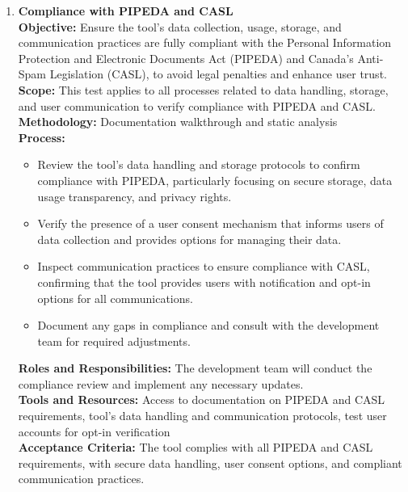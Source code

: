 \documentclass[12pt, titlepage]{article}
\begin{document}
\begin{enumerate}[label={\bf \textcolor{Maroon}{test-SRT-\arabic*}}, wide=0pt, font=\itshape]
\begin{enumerate}[label={\bf \textcolor{Maroon}{test-CPL-\arabic*}}, wide=0pt, font=\itshape]
  \item \textbf{Compliance with PIPEDA and CASL} \\[2mm]
    \textbf{Objective:} Ensure the tool’s data collection, usage, storage, and communication practices are fully compliant with the Personal Information Protection and Electronic Documents Act (PIPEDA) and Canada’s Anti-Spam Legislation (CASL), to avoid legal penalties and enhance user trust. \\[2mm]
    \textbf{Scope:} This test applies to all processes related to data handling, storage, and user communication to verify compliance with PIPEDA and CASL. \\[2mm]
    \textbf{Methodology:} Documentation walkthrough and static analysis \\[2mm]
    \textbf{Process:}
    \begin{itemize}
      \item Review the tool’s data handling and storage protocols to confirm compliance with PIPEDA, particularly focusing on secure storage, data usage transparency, and privacy rights.
      \item Verify the presence of a user consent mechanism that informs users of data collection and provides options for managing their data.
      \item Inspect communication practices to ensure compliance with CASL, confirming that the tool provides users with notification and opt-in options for all communications.
      \item Document any gaps in compliance and consult with the development team for required adjustments.
    \end{itemize}
    \textbf{Roles and Responsibilities:} The development team will conduct the compliance review and implement any necessary updates. \\[2mm]
    \textbf{Tools and Resources:} Access to documentation on PIPEDA and CASL requirements, tool’s data handling and communication protocols, test user accounts for opt-in verification \\[2mm]
    \textbf{Acceptance Criteria:} The tool complies with all PIPEDA and CASL requirements, with secure data handling, user consent options, and compliant communication practices.


\end{enumerate}
\end{enumerate}
\end{document}
